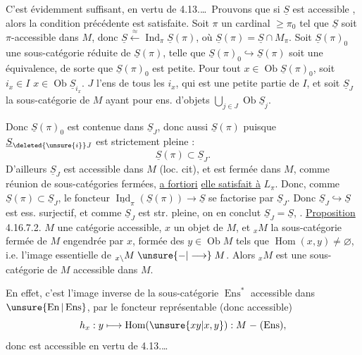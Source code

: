 C'est évidemment suffisant, en
vertu de 4.13.\ldots\ Prouvons  que
si $\underline S$ est accessible , alors la condition
précédente est satisfaite. Soit $\pi$ un cardinal
$\geq\pi_0$ tel que $\underline S$ soit $\pi$-accessible dans
$M$, donc $\underline S\xleftarrow{\approx}\operatorname{Ind}_\pi\underline S(\pi)$, où $\underline S(\pi)=\underline S\cap M_\pi$.
 Soit $\underline S(\pi)_0$ une sous-catégorie réduite
de $\underline S(\pi)$, telle que $\underline S(\pi)_0\hookrightarrow\underline S(\pi)$ soit
une équivalence, de sorte que $\underline S(\pi)_0$ est
petite. Pour tout $x\in\operatorname{Ob}\underline S(\pi)_0$, soit
$i_x\in I$  $x\in\operatorname{Ob}\underline S_{i_x}$. 
$J$ l'ens de tous les $i_x$, qui est
une petite partie de $I$, et soit
$\underline S_J$ la sous-catégorie  de $M$ ayant
pour  ens. d'objets $\bigcup_{j\in J}\operatorname{Ob}\underline S_j$.

 Donc $\underline S(\pi)_0$ est contenue
dans $\underline S_J$, donc aussi $\underline S(\pi)$ puisque
$\underline S_{\deleted{\unsure{i}}J}$ est strictement pleine :
\[
\underline S(\pi)\subset\underline S_J.
\]
D'ailleurs $\underline S_J$ est accessible dans $M$
(loc. cit), et est fermée dans $M$, comme
réunion de sous-catégories fermées, \uline{a fortiori}
\uline{elle satisfait à} $L_\pi$. Donc, comme $\underline S(\pi)\subset\underline S_J$,
le foncteur  $\underline{\operatorname{Ind}}_\pi(\underline S(\pi))\longrightarrow\underline S$ se
factorise par $\underline S_J$. Donc $\underline S_J\hookrightarrow\underline S$ est
ess. surjectif, et comme $\underline S_J$ est str.
pleine, on en conclut $\underline S_J=\underline S$, .
\uline{Proposition} 4.16.7.2.  $M$ une catégorie
accessible, $x$ un objet de $M$, et $ {}_xM$ la
sous-catégorie fermée de $M$ engendrée
par $x$, formée des $y\in\operatorname{Ob}M$ tels que
$\operatorname{Hom}(x,y)\ne\varnothing$, i.e.  l'image essentielle
de $ {}_{x\backslash}M\mathrel{\unsure{-|\longrightarrow}}M$. Alors $ {}_xM$ est une
sous-catégorie de $M$ accessible dans $M$.

En effet, c'est l'image inverse de la
sous-catégorie $\operatorname{Ens}^{*}$ accessible dans $\unsure{\operatorname{En}|\operatorname{Ens}}$,
par le foncteur représentable (donc
accessible)
\[
h_x:y\longmapsto\operatorname{Hom}(\unsure{xy|x,y}):M\mathrel{-}(\operatorname{Ens}),
\]
donc est accessible  en vertu de 4.13.\ldots


